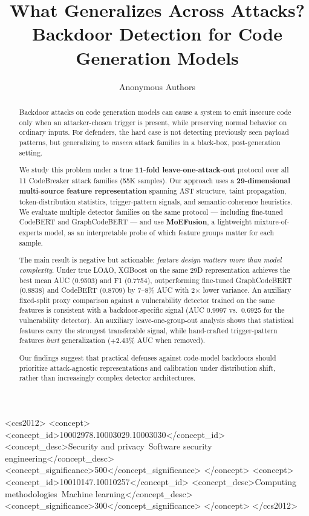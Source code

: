 ﻿\documentclass[sigconf,review,anonymous]{acmart}
\newcommand{\sys}{MoEFusion}
\begin{document}
\title{What Generalizes Across Attacks? Backdoor Detection for Code Generation Models}

\author{Anonymous Authors}


\begin{abstract}
Backdoor attacks on code generation models can cause a system to emit insecure
code only when an attacker-chosen trigger is present, while preserving normal
behavior on ordinary inputs. For defenders, the hard case is not detecting
previously seen payload patterns, but generalizing to \emph{unseen} attack
families in a black-box, post-generation setting.

We study this problem under a true \textbf{11-fold leave-one-attack-out}
protocol over all 11 CodeBreaker attack families (55K samples). Our approach
uses a \textbf{29-dimensional multi-source feature representation} spanning AST
structure, taint propagation, token-distribution statistics, trigger-pattern
signals, and semantic-coherence heuristics. We evaluate multiple detector
families on the same protocol --- including fine-tuned CodeBERT and
GraphCodeBERT --- and
use \textbf{\sys{}}, a lightweight mixture-of-experts model, as an
interpretable probe of which feature groups matter for each sample.

The main result is negative but actionable: \emph{feature design matters more
than model complexity}. Under true LOAO, XGBoost on the same 29D representation
achieves the best mean AUC (0.9503) and F1 (0.7754), outperforming fine-tuned
GraphCodeBERT (0.8838) and CodeBERT (0.8709) by 7--8\% AUC with
2$\times$ lower variance.
An auxiliary fixed-split proxy comparison against a vulnerability detector
trained on the same features is consistent with a backdoor-specific signal (AUC
0.9997 vs.\ 0.6925 for the vulnerability detector).
An auxiliary leave-one-group-out
analysis shows that statistical features carry the strongest transferable
signal, while hand-crafted
trigger-pattern features \emph{hurt} generalization ($+2.43\%$ AUC when
removed).

Our findings suggest that practical defenses against code-model backdoors should
prioritize attack-agnostic representations and calibration under distribution
shift, rather than increasingly complex detector architectures.
\end{abstract}

\begin{CCSXML}
<ccs2012>
<concept>
<concept_id>10002978.10003029.10003030</concept_id>
<concept_desc>Security and privacy~Software security engineering</concept_desc>
<concept_significance>500</concept_significance>
</concept>
<concept>
<concept_id>10010147.10010257</concept_id>
<concept_desc>Computing methodologies~Machine learning</concept_desc>
<concept_significance>300</concept_significance>
</concept>
</ccs2012>
\end{CCSXML}
\end{document}
